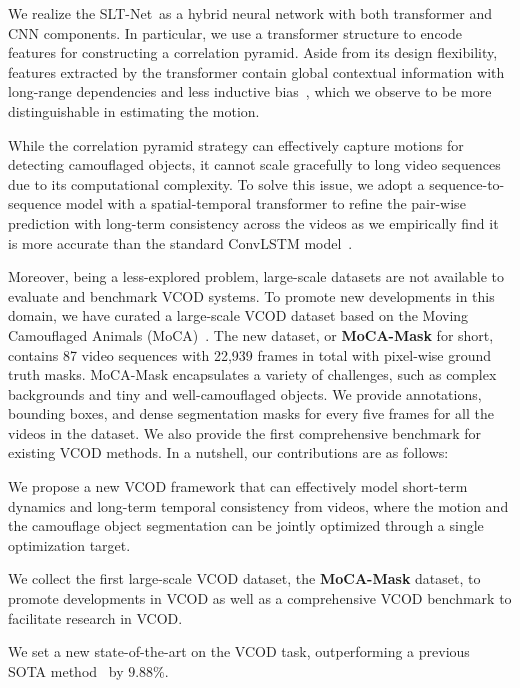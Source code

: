 \documentclass[10pt,twocolumn,letterpaper]{article}
\def\Ourmodel{SLT-Net}
\begin{document}
We realize the \Ourmodel~as a hybrid neural network with both transformer and CNN components. In particular, we use a transformer structure to encode features for constructing a correlation pyramid. Aside from its design flexibility, features extracted by the transformer contain global contextual information with long-range dependencies and less inductive bias~\cite{wang2021pyramid,zhen2022cosformer}, which we observe to be more distinguishable in estimating the motion.

While the correlation pyramid strategy can effectively capture motions for detecting camouflaged objects, it cannot scale gracefully to long video sequences due to its computational complexity. To solve this issue, we adopt a sequence-to-sequence model with a spatial-temporal transformer to refine the pair-wise prediction with long-term consistency across the videos as we empirically find it is more accurate than the standard ConvLSTM model~\cite{xingjian2015convolutional,Zhong_2018_ECCV}. 

Moreover, being a less-explored problem, large-scale datasets are not available to evaluate and benchmark VCOD systems. To promote new developments in this domain, we have curated a large-scale VCOD dataset based on the Moving Camouflaged Animals (MoCA)~\cite{lamdouar2020betrayed}. The new dataset, or \textbf{MoCA-Mask} for short, contains 87 video sequences with 22,939 frames in total with pixel-wise ground truth masks. MoCA-Mask encapsulates a variety of challenges, such as complex backgrounds and tiny and well-camouflaged objects. We provide annotations, bounding boxes, and dense segmentation masks for every five
frames for all the videos in the dataset. 
We also provide the first comprehensive benchmark for existing VCOD methods. 
In a nutshell, our contributions are as follows:
\begin{compactitem}
\item We propose a new VCOD framework that can effectively model short-term dynamics and long-term temporal consistency from videos, where the motion and the camouflage object segmentation can be jointly optimized through a single optimization target. 
\item We collect the first large-scale VCOD dataset, the \textbf{MoCA-Mask} dataset, to promote developments in VCOD as well as a comprehensive VCOD benchmark to facilitate research in VCOD.
\item We set a new state-of-the-art on the VCOD task, outperforming a previous SOTA method~\cite{yan2019semi} by $9.88\%$.\end{compactitem}
\end{document}
